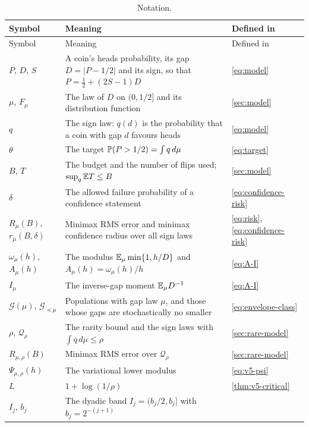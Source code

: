 {\small
\renewcommand{\arraystretch}{1.15}
\begin{longtable}{@{}>{\raggedright\arraybackslash}p{}
                     >{\raggedright\arraybackslash}p{}
                     >{\raggedright\arraybackslash}p{}@{}}
\caption{Notation.}\label{tab:notation}\\
\toprule
Symbol & Meaning & Defined in\\
\midrule
\endfirsthead
\toprule
Symbol & Meaning & Defined in\\
\midrule
\endhead
$P$, $D$, $S$ & A coin's heads probability, its gap $D=|P-1/2|$ and its
 sign, so that $P=\tfrac12+(2S-1)D$ & \eqref{eq:model}\\
$\mu$, $F_\mu$ & The law of $D$ on $(0,1/2]$ and its distribution
 function & \cref{sec:model}\\
$q$ & The sign law: $q(d)$ is the probability that a coin with gap $d$
 favours heads & \eqref{eq:model}\\
$\theta$ & The target $\mathbb P(P>1/2)=\int q\,d\mu$ & \eqref{eq:target}\\
$B$, $T$ & The budget and the number of flips used; $\sup_q\mathbb E T\le B$
 & \cref{sec:model}\\
$\delta$ & The allowed failure probability of a confidence statement
 & \eqref{eq:confidence-risk}\\
$R_\mu(B)$, $r_\mu(B,\delta)$ & Minimax RMS error and minimax confidence
 radius over all sign laws & \eqref{eq:risk}, \eqref{eq:confidence-risk}\\
$\omega_\mu(h)$, $A_\mu(h)$ & The modulus $\mathbb E_\mu\min\{1,h/D\}$ and
 $A_\mu(h)=\omega_\mu(h)/h$ & \eqref{eq:A-I}\\
$I_\mu$ & The inverse-gap moment $\mathbb E_\mu D^{-1}$ & \eqref{eq:A-I}\\
$\mathcal G(\mu)$, $\mathcal G_{\preceq\mu}$ & Populations with gap law
 $\mu$, and those whose gaps are stochastically no smaller
 & \eqref{eq:envelope-class}\\
$\rho$, $\mathcal Q_\rho$ & The rarity bound and the sign laws with
 $\int q\,d\mu\le\rho$ & \cref{sec:rare-model}\\
$R_{\mu,\rho}(B)$ & Minimax RMS error over $\mathcal Q_\rho$
 & \cref{sec:rare-model}\\
$\Psi_{\mu,\rho}(h)$ & The variational lower modulus & \eqref{eq:v5-psi}\\
$L$ & $1+\log(1/\rho)$ & \cref{thm:v5-critical}\\
$I_j$, $b_j$ & The dyadic band $I_j=(b_j/2,b_j]$ with $b_j=2^{-(j+1)}$

\end{longtable}}
